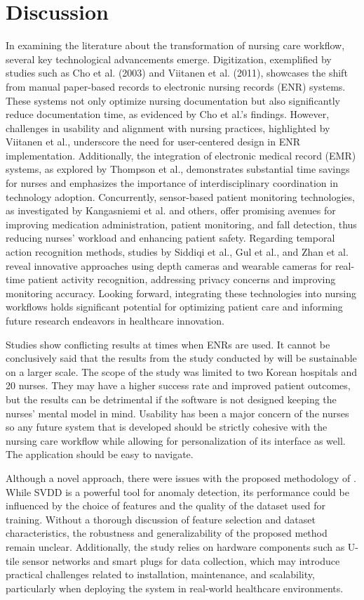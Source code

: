 \section{Discussion}
In examining the literature about the transformation of nursing care workflow, several key technological advancements emerge. Digitization, exemplified by studies such as Cho et al. (2003) and Viitanen et al. (2011), showcases the shift from manual paper-based records to electronic nursing records (ENR) systems. These systems not only optimize nursing documentation but also significantly reduce documentation time, as evidenced by Cho et al.'s findings. However, challenges in usability and alignment with nursing practices, highlighted by Viitanen et al., underscore the need for user-centered design in ENR implementation. Additionally, the integration of electronic medical record (EMR) systems, as explored by Thompson et al., demonstrates substantial time savings for nurses and emphasizes the importance of interdisciplinary coordination in technology adoption. Concurrently, sensor-based patient monitoring technologies, as investigated by Kangasniemi et al. and others, offer promising avenues for improving medication administration, patient monitoring, and fall detection, thus reducing nurses' workload and enhancing patient safety. Regarding temporal action recognition methods, studies by Siddiqi et al., Gul et al., and Zhan et al. reveal innovative approaches using depth cameras and wearable cameras for real-time patient activity recognition, addressing privacy concerns and improving monitoring accuracy. Looking forward, integrating these technologies into nursing workflows holds significant potential for optimizing patient care and informing future research endeavors in healthcare innovation.

Studies show conflicting results at times when ENRs are used. It cannot be conclusively said that the results from the study conducted by \cite{Study3} will be sustainable on a larger scale. The scope of the study was limited to two Korean hospitals and 20 nurses. They may have a higher success rate and improved patient outcomes, but the results can be detrimental if the software is not designed keeping the nurses' mental model in mind. Usability has been a major concern of the nurses so any future system that is developed should be strictly cohesive with the nursing care workflow while allowing for personalization of its interface as well. The application should be easy to navigate. 

Although a novel approach, there were issues with the proposed methodology of \cite{Study7}. While SVDD is a powerful tool for anomaly detection, its performance could be influenced by the choice of features and the quality of the dataset used for training. Without a thorough discussion of feature selection and dataset characteristics, the robustness and generalizability of the proposed method remain unclear. Additionally, the study relies on hardware components such as U-tile sensor networks and smart plugs for data collection, which may introduce practical challenges related to installation, maintenance, and scalability, particularly when deploying the system in real-world healthcare environments. 

